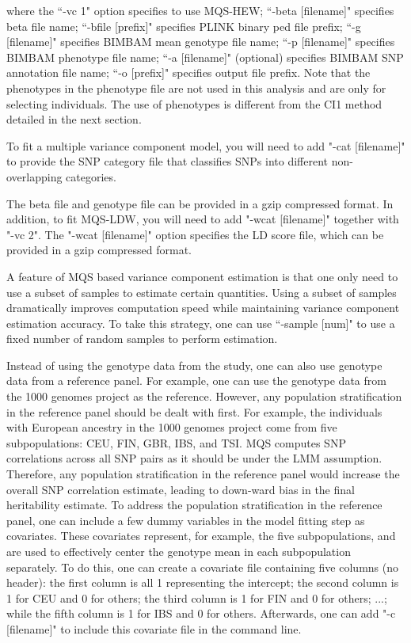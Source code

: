 \documentclass[11pt]{article}
\begin{document}
where the ``-vc 1" option specifies to use MQS-HEW; ``-beta
[filename]" specifies beta file name; ``-bfile [prefix]" specifies
PLINK binary ped file prefix; ``-g [filename]" specifies BIMBAM mean
genotype file name; ``-p [filename]" specifies BIMBAM phenotype file
name; ``-a [filename]" (optional) specifies BIMBAM SNP annotation file
name; ``-o [prefix]" specifies output file prefix. Note that the
phenotypes in the phenotype file are not used in this analysis and are
only for selecting individuals. The use of phenotypes is different
from the CI1 method detailed in the next section.

To fit a multiple variance component model, you will need to add "-cat
[filename]" to provide the SNP category file that classifies SNPs into
different non-overlapping categories.

The beta file and genotype file can be provided in a gzip compressed
format. In addition, to fit MQS-LDW, you will need to add "-wcat
[filename]" together with "-vc 2". The "-wcat [filename]" option
specifies the LD score file, which can be provided in a gzip
compressed format.

A feature of MQS based variance component estimation is that one only need to use a subset of samples to estimate certain quantities. Using a subset of samples dramatically improves computation speed while maintaining variance component estimation accuracy. To take this strategy, one can use ``-sample [num]" to use a fixed number of random samples to perform estimation.

Instead of using the genotype data from the study, one can also use genotype data from a reference panel. For example, one can use the genotype data from the 1000 genomes project as the reference. However, any population stratification in the reference panel should be dealt with first. For example, the individuals with European ancestry in the 1000 genomes project come from five subpopulations: CEU, FIN, GBR, IBS, and TSI. MQS computes SNP correlations across all SNP pairs as it should be under the LMM assumption. Therefore, any population stratification in the reference panel would increase the overall SNP correlation estimate, leading to down-ward bias in the final heritability estimate. To address the population stratification in the reference panel, one can include a few dummy variables in the model fitting step as covariates. These covariates represent, for example, the five subpopulations, and are used to effectively center the genotype mean in each subpopulation separately. To do this, one can create a covariate file containing five columns (no header): the first column is all 1 representing the intercept; the second column is 1 for CEU and 0 for others; the third column is 1 for FIN and 0 for others; ...; while the fifth column is 1 for IBS and 0 for others. Afterwards, one can add "-c [filename]" to include this covariate file in the command line.
\end{document}
